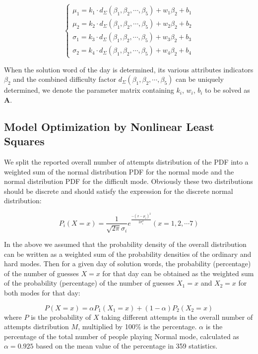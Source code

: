 \documentclass[12pt]{mcmthesis}
\begin{document}
\begin{equation}\label{eq:5}
	\left\{\begin{array}{l}
		\mu_1=k_1\cdot d_{\varSigma }\left(\beta_1, \beta_2, \cdots,\beta_5\right)+w_{1} \beta_2+b_1 \\
		\mu_2=k_2\cdot d_{\varSigma }\left(\beta_1, \beta_2, \cdots,\beta_5\right)+w_{2} \beta_2 +b_2 \\
		\sigma_1=k_3\cdot d_{\varSigma }\left(\beta_1, \beta_2, \cdots,\beta_5\right)+w_{3} \beta_2+b_3 \\
		\sigma_2=k_4\cdot d_{\varSigma }\left(\beta_1, \beta_2, \cdots,\beta_5\right)+w_{4} \beta_2+b_4 
	\end{array}\right.
\end{equation}

When the solution word of the day is determined, its various attributes indicators $\beta_2$ and the combined difficulty factor $ d_{\varSigma }\left(\beta_1, \beta_2, \cdots,\beta_5\right) $ can be uniquely determined, we denote the parameter matrix containing $ k_{i} $, $ w_{i} $, $ b_{i} $ to be solved as $ \boldsymbol{A} $.
\\[0.01pt]
\subsection{Model Optimization by Nonlinear Least Squares}
\hspace{1.4em}We split the reported overall number of attempts distribution of the PDF into a weighted sum of the normal distribution PDF for the normal mode and the normal distribution PDF for the difficult mode. Obviously these two distributions should be discrete and should satisfy the expression for the discrete normal distribution:

\begin{equation}\label{eq:7}
	P_i(X=x)=\dfrac{1}{\sqrt{2 \pi} \sigma_i} e^{\frac{-\left(x-\mu_i\right)^2}{2 \sigma_i^2}}(x=1,2, \cdots 7)
\end{equation}

In the above we assumed that the probability density of the overall distribution can be written as a weighted sum of the probability densities of the ordinary and hard modes. Then for a given day of solution words, the probability (percentage) of the number of guesses $ X=x $ for that day can be obtained as the weighted sum of the probability (percentage) of the number of guesses $ X_{1}=x $ and $ X_{2}=x  $ for both modes for that day:

\begin{equation}\label{eq:8}
P\left( X=x \right) =\alpha P_1\left( X_{1}=x \right) +\left( 1-\alpha \right) P_2\left( X_{2}=x \right) 
\end{equation}
where $ P $ is the probability of $ X $ taking different attempts in the overall number of attempts distribution $ M $, multiplied by 100\% is the percentage. $ \alpha $ is the percentage of the total number of people playing Normal mode, calculated as $ \alpha = 0.925 $ based on the mean value of the percentage in 359 statistics.
\end{document}
